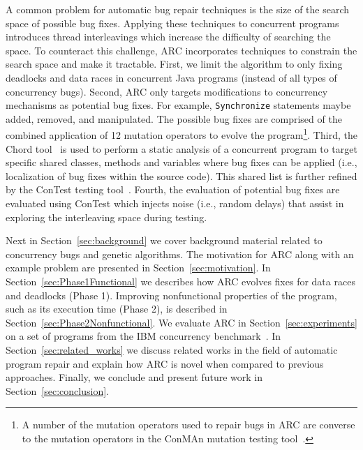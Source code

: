 \documentclass[runningheads,a4paper]{llncs}
\begin{document}
A common problem for automatic bug repair techniques is the size of the search space of possible bug fixes. Applying these techniques to  concurrent programs introduces thread interleavings which increase the difficulty of searching the space. To counteract this challenge, ARC incorporates techniques to constrain the search space and make it tractable. First, we limit the algorithm to only fixing deadlocks and data races in concurrent Java programs (instead of all types of concurrency bugs). Second, ARC only targets modifications to concurrency mechanisms as potential bug fixes. For example, \texttt{Synchronize} statements maybe added, removed, and manipulated. The possible bug fixes are comprised of the combined application of 12 mutation operators to evolve the program\footnote{A number of the mutation operators used to repair bugs in ARC are converse to the mutation operators in the ConMAn mutation testing tool~\cite{BCD06}.}.  Third, the Chord tool~\cite{NA07} is used to perform a static analysis of a concurrent program to target specific shared classes, methods and variables where bug fixes can be applied (i.e., localization of bug fixes within the source code). This shared list is further refined by the ConTest testing tool~\cite{EFN+02}. Fourth, the evaluation of potential bug fixes are evaluated using ConTest which injects noise (i.e., random delays) that assist in exploring the interleaving space during testing. 


Next in Section~\ref{sec:background} we cover background material related to concurrency bugs and genetic algorithms. The motivation for ARC along with an example problem are presented in Section~\ref{sec:motivation}. In Section~\ref{sec:Phase1Functional} we describes how ARC evolves fixes for data races and deadlocks (Phase 1). Improving nonfunctional properties of the program, such as its execution time (Phase 2), is described in Section~\ref{sec:Phase2Nonfunctional}. We evaluate ARC in Section~\ref{sec:experiments} on a set of programs from the IBM concurrency benchmark~\cite{HSU03, EU04, ETU08}. In Section~\ref{sec:related_works} we discuss related works in the field of automatic program repair and explain how ARC is novel when compared to previous approaches. Finally, we conclude and present future work in Section~\ref{sec:conclusion}.
\end{document}
